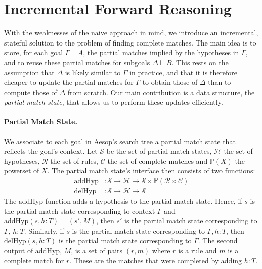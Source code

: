 \documentclass[runningheads]{llncs}
\newcommand{\jcom}[1]{{\color{orange}{Jannis: #1}} }
\newcommand{\Rules}{\ensuremath{\mathcal{R}}}
\newcommand{\Hyps}{\ensuremath{\mathcal{H}}}
\newcommand{\States}{\ensuremath{\mathcal{S}}}
\newcommand{\CMatches}{\ensuremath{\mathcal{C}}}
\newcommand{\addHyp}{\ensuremath{\mathrm{addHyp}}}
\newcommand{\delHyp}{\ensuremath{\mathrm{delHyp}}}
\newcommand{\powerset}{\ensuremath{\mathbb{P}}}
\begin{document}
\jcom{Mention fast subsumption paper?}

\section{Incremental Forward Reasoning}

With the weaknesses of the naive approach in mind, we introduce an incremental, stateful solution to the problem of finding complete matches.
The main idea is to store, for each goal $Γ ⊢ A$, the partial matches implied by the hypotheses in $Γ$, and to reuse these partial matches for subgoals $Δ ⊢ B$.
This rests on the assumption that $Δ$ is likely similar to $Γ$ in practice, and that it is therefore cheaper to update the partial matches for $Γ$ to obtain those of $Δ$ than to compute those of $Δ$ from scratch.
Our main contribution is a data structure, the \emph{partial match state}, that allows us to perform these updates efficiently.

\paragraph{Partial Match State.}
We associate to each goal in Aesop's search tree a partial match state that reflects the goal's context.
Let $\States$ be the set of partial match states, $\Hyps$ the set of hypotheses, $\Rules$ the set of rules, $\CMatches$ the set of complete matches and $\powerset(X)$ the powerset of $X$.
The partial match state's interface then consists of two functions:
\begin{align*}
  \addHyp &: \States → \Hyps → \States × \powerset(\Rules × \CMatches) \\
  \delHyp &: \States → \Hyps → \States
\end{align*}
The $\addHyp$ function adds a hypothesis to the partial match state.
Hence, if $s$ is the partial match state corresponding to context $Γ$ and $\addHyp(s, h : T) = (s', M)$, then $s'$ is the partial match state corresponding to $Γ,\, h : T$.
Similarly, if $s$ is the partial match state corresponding to $Γ, h : T$, then $\delHyp(s, h : T)$ is the partial match state corresponding to $Γ$.
The second output of $\addHyp$, $M$, is a set of pairs $(r, m)$ where $r$ is a rule and $m$ is a complete match for $r$.
These are the matches that were completed by adding $h : T$.
\end{document}
